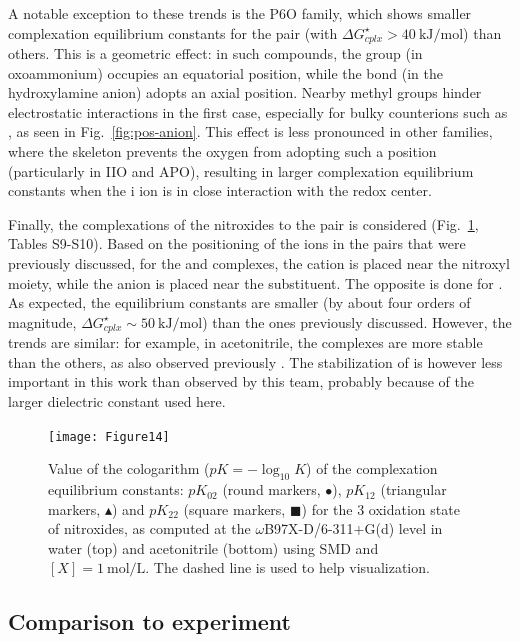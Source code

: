 \documentclass[review,preprint]{elsarticle}
\begin{document}
A notable exception to these trends is the P6O family, which shows smaller complexation equilibrium constants for the  pair (with $\Delta G^\star_{cplx} > \SI{40}{\kilo\joule\per\mole}$) than others. This is a geometric effect: in such compounds, the  group (in oxoammonium) occupies an equatorial position, while the  bond (in the hydroxylamine anion) adopts an axial position. Nearby methyl groups hinder electrostatic interactions in the first case, especially for bulky counterions such as , as seen in Fig.~\ref{fig:pos-anion}. This effect is less pronounced in other families, where the skeleton prevents the oxygen from adopting such a position (particularly in IIO and APO), resulting in larger complexation equilibrium constants when the i ion is in close interaction with the redox center.

Finally, the complexations of the nitroxides to the  pair is considered (Fig.~\ref{fig:Kx2}, Tables S9-S10). Based on the positioning of the ions in the pairs that were previously discussed, for the  and  complexes, the cation is placed near the nitroxyl moiety, while the anion is placed near the substituent. The opposite is done for . As expected, the equilibrium constants are smaller (by about four orders of magnitude, $\Delta G^\star_{cplx} \sim \SI{50}{\kilo\joule\per\mole}$) than the ones previously discussed. However, the trends are similar: for example, in acetonitrile, the  complexes are more stable than the others, as also observed previously \cite{wylieImprovedPerformanceAllOrganic2019a}. The stabilization of  is however less important in this work than observed by this team, probably because of the larger dielectric constant used here.


\begin{figure}[!h]
\centering
\texttt{[image: Figure14]}
\caption{Value of the cologarithm ($pK = -\log_{10}K$) of the complexation equilibrium constants: $pK_{02}$ (round markers, $\bullet$), $pK_{12}$ (triangular markers, $\blacktriangle$) and $pK_{22}$ (square markers, $\blacksquare$) for the 3 oxidation state of nitroxides, as computed at the $\omega$B97X-D/6-311+G(d) level in water (top) and acetonitrile (bottom) using SMD and $[X]=\SI{1}{\mole\per\liter}$.  The dashed line is used to help visualization. }
\label{fig:Kx2}
\end{figure}

\clearpage
\subsection{Comparison to experiment} \label{sec:exp}
\end{document}
